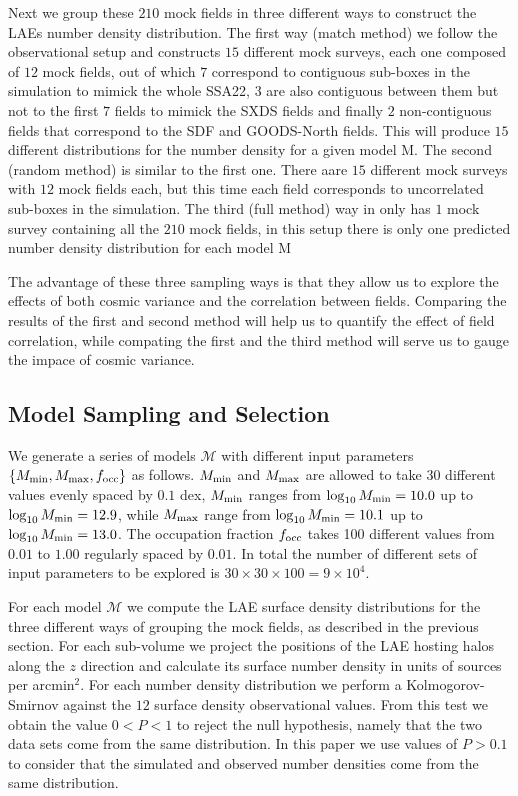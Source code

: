 \documentclass[usenatbib]{mn2e}
\begin{document}
Next we group these $210$ mock fields in three different ways to
construct the LAEs number density distribution. The first way (match method) we
follow the observational setup and constructs $15$ different mock
surveys, each one composed of $12$ mock fields, out of which $7$
correspond to contiguous sub-boxes in the simulation to mimick the
whole SSA22, $3$ are also contiguous between them but not to the first
$7$ fields to mimick the SXDS fields and finally $2$ non-contiguous
fields that correspond to the SDF and GOODS-North fields. This will
produce $15$ different distributions for the number density for a
given model ${\mathrm M}$. The second (random method) is similar to the first
one. There aare $15$ different mock surveys with $12$ mock fields
each, but this time each field corresponds to uncorrelated sub-boxes
in the simulation. The third (full method) way in only has $1$ mock survey
containing all the $210$ mock fields, in this setup there is only one
predicted number density distribution for each model ${\mathrm M}$ 

The advantage of these three sampling ways is that they allow us to
explore the effects of both cosmic variance and the correlation
between fields. Comparing the results of the first and second method
will help us to quantify the effect of field correlation, while
compating the first and the third method will serve us to gauge the
impace of cosmic variance. 


\subsection{Model Sampling and Selection}

We generate a series of models ${\mathcal M}$ with different input
parameters$\{M_{\rm min}, M_{\rm max}, f_{\rm occ}\}$ as
follows. $M_{\rm min}$ and $M_{\rm max}$ are allowed to take 30
different values evenly spaced by $0.1$ dex, $M_{\rm min}$ ranges from
$\log_{10}M_{\rm min}=10.0$ up to $\log_{10}M_{\rm min}=12.9$, while
$M_{\rm max}$ range  from $\log_{10}M_{\rm min}=10.1$ up to
$\log_{10}M_{\rm min}=13.0$. The occupation fraction $f_{\rm occ}$
takes 100 different values from $0.01$ to $1.00$ regularly spaced by
$0.01$. In total the number of different sets of input parameters to
be explored is $30 \times 30\times 100 = 9\times 10^{4}$. 

For each model ${\mathcal M}$ we compute the LAE surface density
distributions for the three different ways of grouping the mock
fields, as described in the previous section. For each sub-volume we
project the positions of the LAE hosting halos along the $z$ direction
and calculate its surface number density in units of sources per
arcmin$^{2}$. For each number density distribution we perform a
Kolmogorov-Smirnov against the $12$ surface density observational
values. From this test we obtain the value $0<P<1$ to reject the null
hypothesis, namely that the two data sets come from the same
distribution. In this paper we use values of $P>0.1$ to consider that
the simulated and observed number densities come from the same
distribution. 
\end{document}

